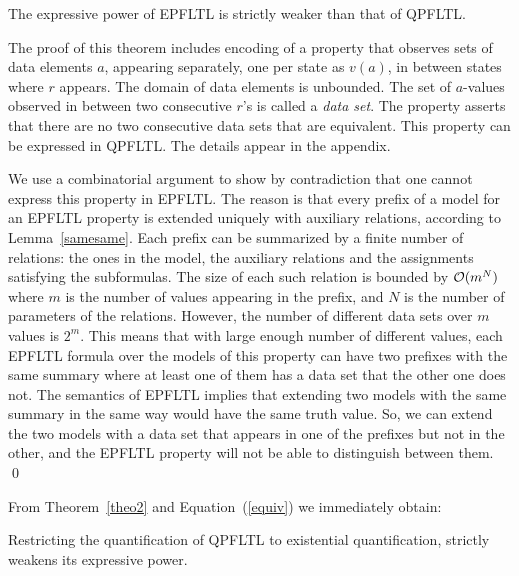 \begin{theorem}
\label{theo2}
The expressive power of EPFLTL is strictly weaker than that of QPFLTL.
\end{theorem}

The proof of this theorem includes encoding of a  property that
observes sets of data elements $a$, appearing separately, one per state as $v (a)$,
in between states where $r$ appears. The domain of data elements is unbounded.
The set of $a$-values observed in between two consecutive $r$'s is called a {\em data set}.
The property asserts that there are no two consecutive data sets that are equivalent.
This property can be expressed in QPFLTL. The details appear in the appendix.

We use a combinatorial argument to show by contradiction that one cannot express this property
in EPFLTL. The reason is that every prefix of a model for an EPFLTL property is extended uniquely with
auxiliary relations, according to Lemma~\ref{samesame}. Each prefix can be summarized by a finite number of relations: the ones in
the model, the auxiliary relations and the
assignments satisfying the subformulas. The size of
each such relation is bounded by ${\cal O} (  m ^ N )$
where $m$ is the number of values appearing in the
prefix, and $N$ is the number of parameters of the relations.
However, the number of different data sets over $m$ values is
$2^m$. This means that with large enough number of different values, each EPFLTL formula over the models of this property can have two prefixes with the same summary where at least one of them has a data set that the other one does not. The semantics of EPFLTL implies that extending
two models with the same summary in the same way would have the same truth value. So, we can extend
the two models with a data set that appears in one of the
prefixes but not  in the other, and the EPFLTL property will not be able to distinguish between them. \qed



\vspace{0.7ex} From Theorem~\ref{theo2} and Equation~(\ref{equiv}) we immediately obtain:
\begin{corollary}
Restricting the quantification of QPFLTL to existential quantification, strictly weakens its expressive power.
\end{corollary}

